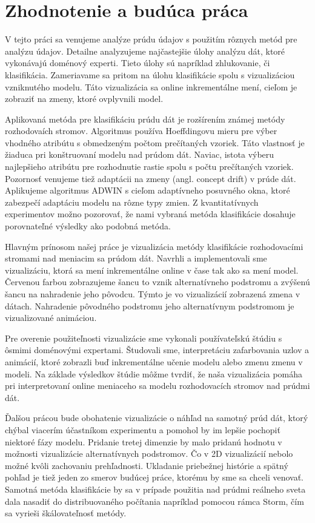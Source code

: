 \chapter{Zhodnotenie a budúca práca}
\label{Zhodnotenie a budúca práca}

V tejto práci sa venujeme analýze prúdu údajov s použitím rôznych metód pre analýzu údajov. Detailne analyzujeme najčastejšie úlohy analýzu dát, ktoré vykonávajú doménový experti. Tieto úlohy sú napríklad zhlukovanie, či klasifikácia. Zameriavame sa pritom na úlohu klasifikácie spolu s vizualizáciou vzniknutého modelu. Táto vizualizácia sa online inkrementálne mení, cieľom je zobraziť na zmeny, ktoré ovplyvnili model.
\par
Aplikovaná metóda pre klasifikáciu prúdu dát je rozšírením známej metódy rozhodovaích stromov. Algoritmus používa Hoeffdingovu mieru pre výber vhodného atribútu s obmedzeným počtom prečítaných vzoriek. Táto vlastnosť je žiaduca pri konštruovaní modelu nad prúdom dát. Naviac, istota výberu najlepšieho atribútu pre rozhodnutie rastie spolu s počtu prečítaných vzoriek. Pozornosť venujeme tiež adaptácii na zmeny (angl. concept drift) v prúde dát. Aplikujeme algoritmus ADWIN s cieľom adaptívneho posuvného okna, ktoré zabezpečí adaptáciu modelu na rôzne typy zmien. Z kvantitatívnych experimentov možno pozorovať, že nami vybraná metóda klasifikácie dosahuje porovnateľné výsledky ako podobná metóda.
\par
Hlavným prínosom našej práce je vizualizácia metódy klasifikácie rozhodovacími stromami nad meniacim sa prúdom dát. Navrhli a implementovali sme vizualizáciu, ktorá sa mení inkrementálne online v čase tak ako sa mení model. Červenou farbou zobrazujeme šancu to vznik alternatívneho podstromu a zvýšenú šancu na nahradenie jeho pôvodcu. Týmto je vo vizualizácií zobrazená zmena v dátach. Nahradenie pôvodného podstromu jeho alternatívnym podstromom je vizualizované animáciou.
\par
Pre overenie použiteľnosti vizualizácie sme vykonali používateľskú štúdiu s ôsmimi doménovými expertami. Študovali sme, interpretáciu zafarbovania uzlov a animácií, ktoré zobrazli buď inkrementálne učenie modelu alebo zmenu zmenu v modeli. Na základe výsledkov štúdie môžme tvrdiť, že naša vizualizácia pomáha pri interpretovaní online meniaceho sa modelu rozhodovacích stromov nad prúdmi dát.
\par
Ďalšou prácou bude obohatenie vizualizácie o náhľad na samotný prúd dát, ktorý chýbal viacerím účastníkom experimentu a pomohol by im lepšie pochopiť niektoré fázy modelu. Pridanie tretej dimenzie by malo pridanú hodnotu v možnosti vizualizácie alternatívnych podstromov. Čo v 2D vizualizácií nebolo možné kvôli zachovaniu prehľadnosti. Ukladanie priebežnej histórie a spätný pohľad je tiež jeden zo smerov budúcej práce, ktorému by sme sa chceli venovať. Samotná metóda klasifikácie by sa v prípade použitia nad prúdmi reálneho sveta dala nasadiť do distribuovaného počítania napríklad pomocou rámca Storm, čím sa vyrieši škálovateľnosť metódy.